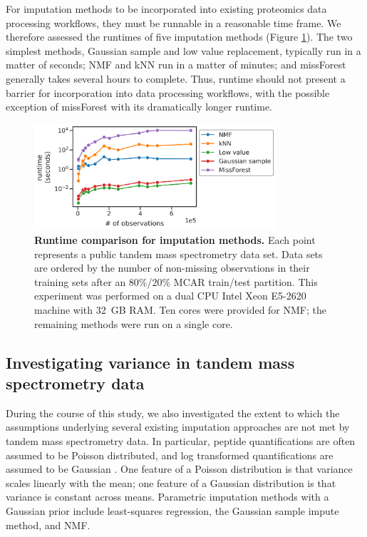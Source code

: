 \documentclass{article}
\begin{document}
For imputation methods to be incorporated into existing proteomics data processing workflows, they must be runnable in a reasonable time frame. We therefore assessed the runtimes of five imputation methods (Figure \ref{fig:runtime}). The two simplest methods, Gaussian sample and low value replacement, typically run in a matter of seconds; NMF and kNN run in a matter of minutes; and missForest generally takes several hours to complete. Thus, runtime should not present a barrier for incorporation into data processing workflows, with the possible exception of missForest with its dramatically longer runtime.

\begin{figure}
  \centering
  \includegraphics[width=0.8\textwidth]{figures/runtimes-plotted-lineplot-cp1.png}
  \caption{{\bf Runtime comparison for imputation methods.} Each point represents a public tandem mass spectrometry data set. Data sets are ordered by the number of non-missing observations in their training sets after an 80\%/20\% MCAR train/test partition. This experiment was performed on a dual CPU Intel Xeon E5-2620 machine with 32~GB RAM. Ten cores were provided for NMF; the remaining methods were run on a single core.}
  \label{fig:runtime}
\end{figure} 

\subsection{Investigating variance in tandem mass spectrometry data}

During the course of this study, we also investigated the extent to which the assumptions underlying several existing imputation approaches are not met by tandem mass spectrometry data. In particular, peptide quantifications are often assumed to be Poisson distributed, and log transformed quantifications are assumed to be Gaussian \cite{ms-dist-derivation, stat-theory-lcms, kimmel-2005}. One feature of a Poisson distribution is that variance scales linearly with the mean; one feature of a Gaussian distribution is that variance is constant across means. Parametric imputation methods with a Gaussian prior include least-squares regression, the Gaussian sample impute method, and NMF. 
\end{document}
